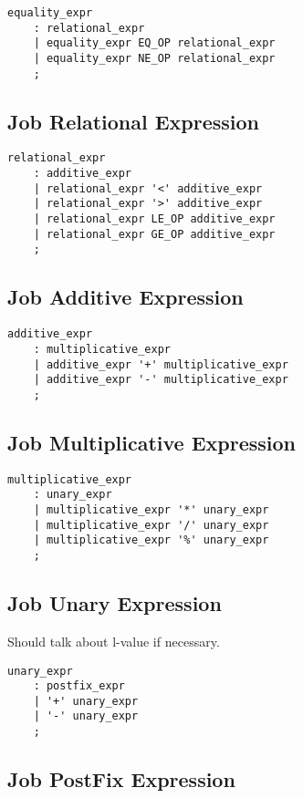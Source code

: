 \documentclass[prodmode,acmtecs]{acmsmall}
\begin{document}
\begin{lstlisting}
equality_expr
	: relational_expr
	| equality_expr EQ_OP relational_expr
	| equality_expr NE_OP relational_expr
	;
\end{lstlisting}

\subsection{Job Relational Expression}

\begin{lstlisting}
relational_expr
	: additive_expr
	| relational_expr '<' additive_expr
	| relational_expr '>' additive_expr
	| relational_expr LE_OP additive_expr
	| relational_expr GE_OP additive_expr
	;
\end{lstlisting}

\subsection{Job Additive Expression}

\begin{lstlisting}
additive_expr
	: multiplicative_expr
	| additive_expr '+' multiplicative_expr
	| additive_expr '-' multiplicative_expr
	;
\end{lstlisting}

\subsection{Job Multiplicative Expression}

\begin{lstlisting}
multiplicative_expr
	: unary_expr
	| multiplicative_expr '*' unary_expr
	| multiplicative_expr '/' unary_expr
	| multiplicative_expr '%' unary_expr
	;
\end{lstlisting}

\subsection{Job Unary Expression}
Should talk about l-value if necessary.

\begin{lstlisting}
unary_expr
	: postfix_expr
	| '+' unary_expr
	| '-' unary_expr
	;
\end{lstlisting}

\subsection{Job PostFix Expression}
\end{document}

